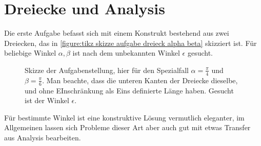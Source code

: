 \documentclass[english, parskip=full]{scrartcl}
\title{\titel}
\author{\autor}
\date{\today}
\begin{document}

\section{Dreiecke und Analysis}
Die erste Aufgabe befasst sich mit einem Konstrukt bestehend aus zwei Dreiecken, das in \autoref{figure:tikz skizze aufgabe dreieck alpha beta} skizziert ist.
Für beliebige Winkel $\alpha,\beta$ ist nach dem unbekannten Winkel $\epsilon$ gesucht.\\
\begin{figure}[!ht]
\centering
{}
\caption{Skizze der Aufgabenstellung, hier für den Spezialfall $\alpha=\frac{\pi}{4}$ und $\beta = \frac{\pi}{6}$.
Man beachte, dass die unteren Kanten der Dreiecke dieselbe, und ohne EInschränkung als Eins definierte Länge haben.
Gesucht ist der Winkel $\epsilon$.}
\label{figure:tikz skizze aufgabe dreieck alpha beta}
\end{figure}
Für bestimmte Winkel ist eine konstruktive Lösung vermutlich eleganter, im Allgemeinen lassen sich Probleme dieser Art aber auch gut mit etwas Transfer aus Analysis bearbeiten.
\end{document}
